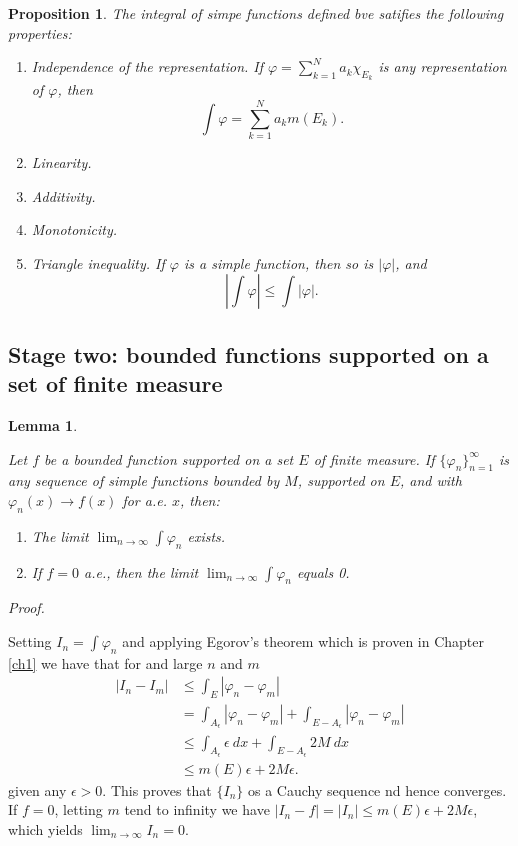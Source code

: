 \documentclass[
]{book}
\providecommand{\tightlist}{%
  \setlength{\itemsep}{0pt}\setlength{\parskip}{0pt}}
\newtheorem{lemma}{Lemma}[chapter]
\newtheorem{proposition}{Proposition}[chapter]
\theoremstyle{definition}
\theoremstyle{definition}
\theoremstyle{definition}
\theoremstyle{definition}
\theoremstyle{remark}
\begin{document}
\begin{proposition}

The integral of simpe functions defined bve satifies the following properties:

\begin{enumerate}
\def\labelenumi{\arabic{enumi}.}
\tightlist
\item
  Independence of the representation. If \(\varphi=\sum_{k=1}^Na_k\chi_{E_k}\) is any representation of \(\varphi\), then
  \[
  \int \varphi=\sum_{k=1}^Na_km(E_k).
  \]
\item
  Linearity.
\item
  Additivity.
\item
  Monotonicity.
\item
  Triangle inequality. If \(\varphi\) is a simple function, then so is \(|\varphi|\), and
  \[
  \left|\int\varphi\right|\le \int|\varphi|.
  \]
\end{enumerate}

\end{proposition}

\subsection{Stage two: bounded functions supported on a set of finite measure}\label{stage-two-bounded-functions-supported-on-a-set-of-finite-measure}

\begin{lemma}
\protect\hypertarget{lem:l}{}\label{lem:l}

Let \(f\) be a bounded function supported on a set \(E\) of finite measure. If \(\{\varphi_n\}_{n=1}^\infty\) is any sequence of simple functions bounded by \(M\), supported on \(E\), and with \(\varphi_n(x)\to f(x)\) for a.e. \(x\), then:

\begin{enumerate}
\def\labelenumi{\arabic{enumi}.}
\tightlist
\item
  The limit \(\lim_{n\to\infty}\int\varphi_n\) exists.
\item
  If \(f=0\) a.e., then the limit \(\lim_{n\to\infty}\int\varphi_n\) equals 0.
\end{enumerate}

\end{lemma}

\emph{Proof.}

Setting \(I_n=\int\varphi_n\) and applying Egorov's theorem which is proven in Chapter \ref{ch1} we have that for and large \(n\) and \(m\)
\[
\begin{aligned}
|I_n-I_m| &\le \int_E|\varphi_n-\varphi_m|\\
&=\int_{A_\epsilon}|\varphi_n-\varphi_m|+\int_{E-A_\epsilon}|\varphi_n-\varphi_m|\\
&\le \int_{A_\epsilon}\epsilon\ dx+\int_{E-A_\epsilon}2M\ dx\\
&\le m(E)\epsilon+2M\epsilon.
\end{aligned}
\]
given any \(\epsilon>0\).
This proves that \(\{I_n\}\) os a Cauchy sequence nd hence converges. If \(f=0\), letting \(m\) tend to infinity we have \(|I_n-f|=|I_n|\le m(E)\epsilon+2M\epsilon\), which yields \(\lim_{n\to\infty}I_n=0\).
\end{document}
